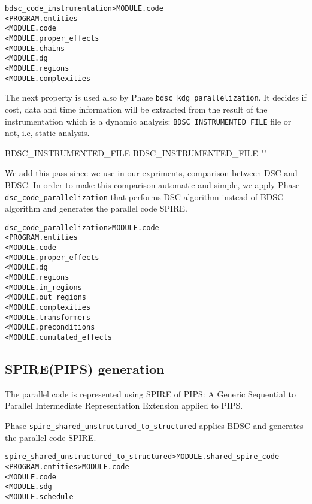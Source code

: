 \documentclass[a4paper]{report}
\newenvironment{PipsMake}{\begin{alltt}}{\end{alltt}}
\newenvironment{PipsPass}[1]{\label{pass:#1}}{}
\begin{document}
\begin{PipsMake}
bdsc_code_instrumentation                    > MODULE.code
        < PROGRAM.entities
        < MODULE.code
        < MODULE.proper_effects
        < MODULE.chains
        < MODULE.dg
        < MODULE.regions
        < MODULE.complexities
\end{PipsMake}

The next property is used also by Phase \texttt{bdsc\_kdg\_parallelization}. It
decides if cost, data and time information will be extracted from the
result of the instrumentation which is a dynamic analysis: \texttt{BDSC\_INSTRUMENTED\_FILE} file or
not, i.e, static analysis.
\begin{PipsProp}{BDSC_INSTRUMENTED_FILE}
BDSC_INSTRUMENTED_FILE ""
\end{PipsProp}

\begin{PipsPass}{dsc_code_parallelization}
We add this pass since we use in our expriments, comparison between
DSC and BDSC. In order to make this comparison automatic and simple,
we apply Phase \texttt{dsc\_code\_parallelization} that performs DSC algorithm
instead of BDSC algorithm and generates the parallel code SPIRE.
\end{PipsPass}

\begin{PipsMake}
dsc_code_parallelization                    > MODULE.code
        < PROGRAM.entities
        < MODULE.code
        < MODULE.proper_effects
        < MODULE.dg
        < MODULE.regions
        < MODULE.in_regions
        < MODULE.out_regions
        < MODULE.complexities
        < MODULE.transformers
        < MODULE.preconditions
        < MODULE.cumulated_effects
\end{PipsMake}



\subsection{SPIRE(PIPS) generation}
The parallel code is represented using  SPIRE of PIPS: A Generic
Sequential to Parallel Intermediate Representation Extension applied
to PIPS.

\begin{PipsPass}{spire_shared_unstructured_to_structured}
Phase \texttt{spire\_shared\_unstructured\_to\_structured} applies BDSC and generates the parallel code SPIRE.
\end{PipsPass}

\begin{PipsMake}
spire_shared_unstructured_to_structured                   > MODULE.shared_spire_code
        < PROGRAM.entities                                > MODULE.code
        < MODULE.code
        < MODULE.sdg
        < MODULE.schedule
\end{PipsMake}
\end{document}
